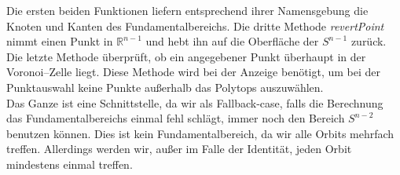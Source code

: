          Die ersten beiden Funktionen liefern entsprechend ihrer Namensgebung die Knoten und Kanten des Fundamentalbereichs. Die dritte Methode \emph{revertPoint} nimmt einen Punkt in $\mathbb{R}^{n-1}$ und
         hebt ihn auf die Oberfläche der $S^{n-1}$ zurück. Die letzte Methode überprüft, ob ein angegebener Punkt überhaupt in der Voronoi--Zelle liegt.
         Diese Methode wird bei der Anzeige benötigt, um bei der Punktauswahl keine Punkte außerhalb das Polytops auszuwählen.\\

         Das Ganze ist eine Schnittstelle, da wir als Fallback-case, falls die Berechnung das Fundamentalbereichs einmal fehl schlägt, immer noch 
         den Bereich $S^{n-2}$ benutzen können. Dies ist kein Fundamentalbereich, da wir alle Orbits mehrfach treffen. Allerdings werden wir, außer im Falle
         der Identität, jeden Orbit mindestens einmal treffen.
